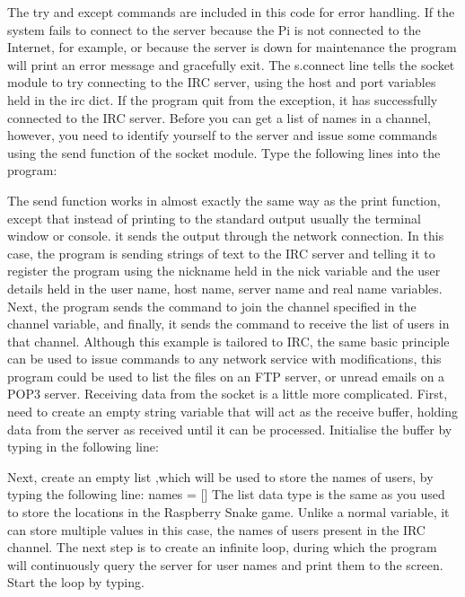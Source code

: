 The try and except commands are included in this code for error handling. If the system fails to connect to the server because the Pi is not connected to the Internet, for example, or because the server is down for maintenance the program will print an error message and gracefully exit. The s.connect line tells the socket module to try connecting to the IRC server, using the host and port variables held in the irc dict. If the program quit from the exception, it has successfully connected to the IRC server. Before you can get a list of names in a channel, however, you need to identify yourself to the server and issue some commands using the send function of the socket module. Type the following lines into the program:

The send function works in almost exactly the same way as the print function, except that instead of printing to the standard output usually the terminal window or console. it sends the output through the network connection. In this case, the program is sending strings of text to the IRC server and telling it to register the program using the nickname held in the nick variable and the user details held in the user name, host name, server name and real name variables. Next, the program sends the command to join the channel specified in the channel variable, and finally, it sends the command to receive the list of users in that channel. Although this example is tailored to IRC, the same basic principle can be used to issue commands to any network service with modifications, this program could be used to list the files on an FTP server, or unread emails on a POP3 server. Receiving data from the socket is a little more complicated. First,  need to create an empty string variable that will act as the receive buffer, holding data from the server as received until it can be processed. Initialise the buffer by typing in the following line:

Next, create an empty list ,which will be used to store the names of users, by typing the following line: names = []
The list data type is the same as you used to store the locations in the Raspberry Snake game. Unlike a normal variable, it can store multiple values in this case, the names of users present in the IRC channel. The next step is to create an infinite loop, during which the program will continuously query the server for user names and print them to the screen. Start the loop by typing.

